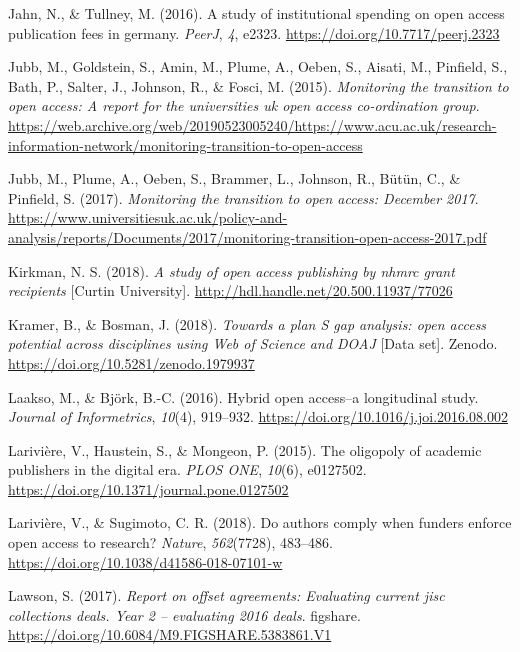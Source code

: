 \documentclass[a4paper,man,floatsintext,longtable,noextraspace,12pt]{apa6}
\newlength{\cslhangindent}
\newenvironment{cslreferences}%
  {\setlength{\parindent}{0pt}%
  \everypar{\setlength{\hangindent}{\cslhangindent}}\ignorespaces}%
  {\par}
\begin{document}
\begin{cslreferences}
\leavevmode\hypertarget{ref-Jahn_2016}{}%
Jahn, N., \& Tullney, M. (2016). A study of institutional spending on
open access publication fees in germany. \emph{PeerJ}, \emph{4}, e2323.
\url{https://doi.org/10.7717/peerj.2323}

\leavevmode\hypertarget{ref-Jubb_2015}{}%
Jubb, M., Goldstein, S., Amin, M., Plume, A., Oeben, S., Aisati, M.,
Pinfield, S., Bath, P., Salter, J., Johnson, R., \& Fosci, M. (2015).
\emph{Monitoring the transition to open access: A report for the
universities uk open access co-ordination group}.
\url{https://web.archive.org/web/20190523005240/https://www.acu.ac.uk/research-information-network/monitoring-transition-to-open-access}

\leavevmode\hypertarget{ref-Jubb_2017}{}%
Jubb, M., Plume, A., Oeben, S., Brammer, L., Johnson, R., Bütün, C., \&
Pinfield, S. (2017). \emph{Monitoring the transition to open access:
December 2017}.
\url{https://www.universitiesuk.ac.uk/policy-and-analysis/reports/Documents/2017/monitoring-transition-open-access-2017.pdf}

\leavevmode\hypertarget{ref-Kirkman_2018}{}%
Kirkman, N. S. (2018). \emph{A study of open access publishing by nhmrc
grant recipients} {[}Curtin University{]}.
\url{http://hdl.handle.net/20.500.11937/77026}

\leavevmode\hypertarget{ref-Kramer_2018}{}%
Kramer, B., \& Bosman, J. (2018). \emph{Towards a plan S gap analysis:
open access potential across disciplines using Web of Science and DOAJ}
{[}Data set{]}. Zenodo. \url{https://doi.org/10.5281/zenodo.1979937}

\leavevmode\hypertarget{ref-Laakso_2016}{}%
Laakso, M., \& Björk, B.-C. (2016). Hybrid open access--a longitudinal
study. \emph{Journal of Informetrics}, \emph{10}(4), 919--932.
\url{https://doi.org/10.1016/j.joi.2016.08.002}

\leavevmode\hypertarget{ref-Larivi_re_2015}{}%
Larivière, V., Haustein, S., \& Mongeon, P. (2015). The oligopoly of
academic publishers in the digital era. \emph{PLOS ONE}, \emph{10}(6),
e0127502. \url{https://doi.org/10.1371/journal.pone.0127502}

\leavevmode\hypertarget{ref-Larivi_re_2018}{}%
Larivière, V., \& Sugimoto, C. R. (2018). Do authors comply when funders
enforce open access to research? \emph{Nature}, \emph{562}(7728),
483--486. \url{https://doi.org/10.1038/d41586-018-07101-w}

\leavevmode\hypertarget{ref-Lawson_2018}{}%
Lawson, S. (2017). \emph{Report on offset agreements: Evaluating current
jisc collections deals. Year 2 -- evaluating 2016 deals}. figshare.
\url{https://doi.org/10.6084/M9.FIGSHARE.5383861.V1}


\end{cslreferences}
\end{document}
